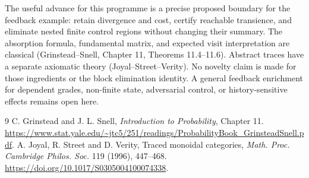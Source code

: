 \documentclass[11pt]{article}
\begin{document}
The useful advance for this programme is a precise proposed boundary for the feedback example: retain divergence and cost, certify reachable transience, and eliminate nested finite control regions without changing their summary. The absorption formula, fundamental matrix, and expected visit interpretation are classical (Grinstead--Snell, Chapter 11, Theorems 11.4--11.6). Abstract traces have a separate axiomatic theory (Joyal--Street--Verity). No novelty claim is made for those ingredients or the block elimination identity. A general feedback enrichment for dependent grades, non-finite state, adversarial control, or history-sensitive effects remains open here.
\begin{thebibliography}{9}
 C. Grinstead and J. L. Snell, \emph{Introduction to Probability}, Chapter 11. \url{https://www.stat.yale.edu/~jtc5/251/readings/ProbabilityBook_GrinsteadSnell.pdf}.
 A. Joyal, R. Street and D. Verity, Traced monoidal categories, \emph{Math. Proc. Cambridge Philos. Soc.} 119 (1996), 447--468. \url{https://doi.org/10.1017/S0305004100074338}.
\end{thebibliography}
\end{document}
